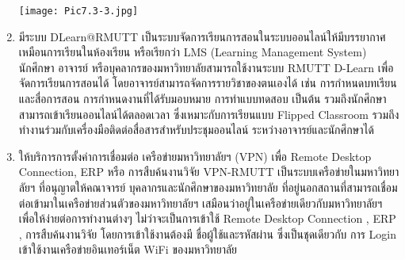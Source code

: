 \begin{enumerate}
\texttt{[image: Pic7.3-3.jpg]}\\
\item มีระบบ DLearn@RMUTT เป็นระบบจัดการเรียนการสอนในระบบออนไลน์ให้มีบรรยากาศ
เหมือนการเรียนในห้องเรียน หรือเรียกว่า LMS (Learning Management System) นักศึกษา อาจารย์ หรือบุคลากรของมหาวิทยาลัยสามารถใช้งานระบบ RMUTT D-Learn เพื่อจัดการเรียนการสอนได้ โดยอาจารย์สามารถจัดการรายวิชาของตนเองได้ เช่น การกำหนดบทเรียนและสื่อการสอน การกำหนดงานที่ได้รับมอบหมาย การทำแบบทดสอบ เป็นต้น รวมถึงนักศึกษาสามารถเข้าเรียนออนไลน์ได้ตลอดเวลา ซึ่งเหมาะกับการเรียนแบบ Flipped Classroom รวมถึงทำงานร่วมกับเครื่องมือติดต่อสื่อสารสำหรับประชุมออนไลน์ ระหว่างอาจารย์และนักศึกษาได้
\item ให้บริการการตั้งค่าการเชื่อมต่อ เครือข่ายมหาวิทยาลัยฯ (VPN) เพื่อ Remote Desktop 
Connection, ERP หรือ การสืบค้นงานวิจัย  VPN-RMUTT เป็นระบบเครือข่ายในมหาวิทยาลัยฯ ที่อนุญาตให้คณาจารย์ บุคลากรและนักศึกษาของมหาวิทยาลัย ที่อยู่นอกสถานที่สามารถเชื่อมต่อเข้ามาในเครือข่ายส่วนตัวของมหาวิทยาลัยฯ เสมือนว่าอยู่ในเครือข่ายเดียวกับมหาวิทยาลัยฯ เพื่อให้ง่ายต่อการทำงานต่างๆ ไม่ว่าจะเป็นการเข้าใช้ Remote Desktop Connection , ERP , การสืบค้นงานวิจัย โดยการเข้าใช้งานต้องมี ชื่อผู้ใช้และรหัสผ่าน ซึ่งเป็นชุดเดียวกับ การ Login เข้าใช้งานเครือข่ายอินเทอร์เน็ต WiFi ของมหาวิทยาลัย


\end{enumerate}
\begin{doclist}
\end{doclist}


